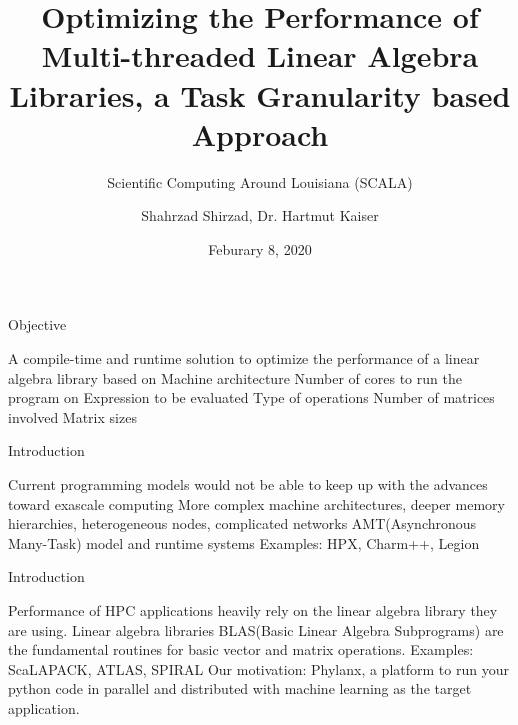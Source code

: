 \documentclass[10pt]{beamer}
\title{Optimizing the Performance of Multi-threaded Linear Algebra Libraries, a Task Granularity based Approach }
\subtitle{Scientific Computing Around Louisiana (SCALA)}
\author{Shahrzad Shirzad, Dr. Hartmut Kaiser}
\date{Feburary 8, 2020}
\institute{Louisiana State University}
\begin{document}


\maketitle


\begin{frame}{Objective}
		\begin{outline}
			A compile-time and runtime solution to optimize the performance of a linear algebra library based on 
			\1Machine architecture
			\1Number of cores to run the program on
			\1Expression to be evaluated 
			\2Type of operations
			\2Number of matrices involved
			\2Matrix sizes
		\end{outline}		
\end{frame}

\begin{frame}{Introduction}
	\begin{outline}
	\1Current programming models would not be able to keep up with the advances toward exascale computing 
	\2More complex machine architectures, deeper memory hierarchies, heterogeneous nodes, complicated networks
	\1AMT(Asynchronous Many-Task) model and runtime systems 		
	\2Examples: HPX, Charm++, Legion
	
	\end{outline}
\end{frame}

\begin{frame}{Introduction}
	\begin{outline}
	
\1Performance of HPC applications heavily rely on the linear algebra library they are using.
		\1Linear algebra libraries
		\2BLAS(Basic Linear Algebra Subprograms) are the fundamental routines for basic vector and matrix operations.
		\2Examples: ScaLAPACK, ATLAS, SPIRAL	
		\1Our motivation:
		\2Phylanx, a platform to run your python code in parallel and distributed with machine learning as the target application.
	\end{outline}
\end{frame}
\end{document}
